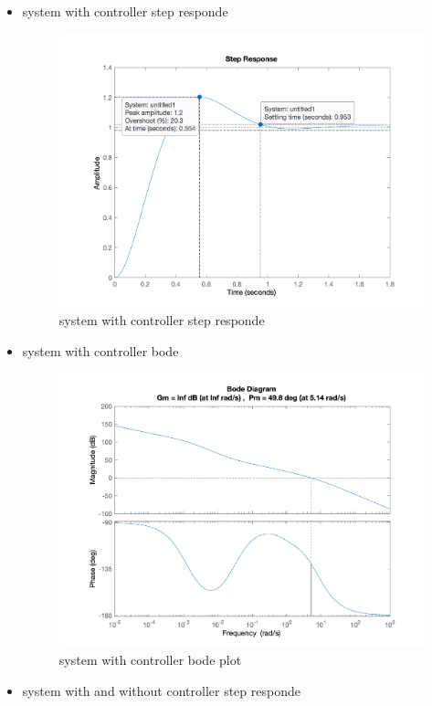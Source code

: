 \begin{itemize}
\begin{figure}[H]
    \end{figure}
    \item system with controller step responde
    \begin{figure}[H]
        \caption{system with controller step responde}
        \centering
        \includegraphics[width=12cm]{../Figure/Q2/Q2_system_controller_respond.png}
    \end{figure}
    \item system with controller bode
    \begin{figure}[H]
        \caption{system with controller bode plot}
        \centering
        \includegraphics[width=12cm]{../Figure/Q2/Q2_system_controller_margin.png}
    \end{figure}
    \item system with and without controller step responde
    \begin{figure}[H]

\end{figure}
\end{itemize}
